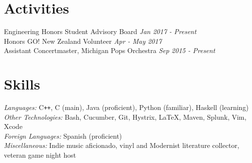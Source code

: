 \documentclass[margin,line]{resume}
\begin{document}
\begin{resume}
	\sectionbreak
	\vspace{-2.5mm}
	\section{\mysidestyle Activities}
	\begin{flushright}
		\vspace{-7.5mm}
		Engineering Honors Student Advisory Board	\hfill  \textsl{Jan 2017 - Present} \\
		Honors GO! New Zealand Volunteer \hfill \textsl{Apr - May 2017} \\
		Assistant Concertmaster, Michigan Pops Orchestra  \hfill \textsl{Sep 2015 - Present}\\
	\end{flushright}
	\vspace{-1.5mm}
	    
	\sectionbreak
	\vspace{-2.5mm}
	\section{\mysidestyle Skills}
	\emph{Languages:} C\texttt{++}, C (main), Java (proficient), Python (familiar), Haskell (learning) \\
	\emph{Other Technologies:} Bash, Cucumber, Git, Hystrix, \LaTeX, Maven, Splunk, Vim, Xcode \\
	\emph{Foreign Languages:} Spanish (proficient) \\
	\emph{Miscellaneous:}  Indie music aficionado, vinyl and Modernist literature collector, veteran game night host
	
\end{resume}
\end{document}
